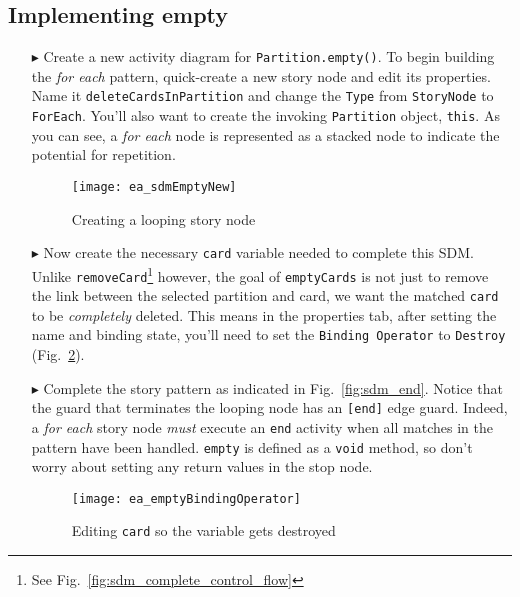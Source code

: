 \newpage
\hypertarget{emptyPartition vis}{}
\subsection{Implementing empty}
\visHeader

\begin{itemize}

\item[$\blacktriangleright$] Create a new activity diagram for \texttt{Partition.empty()}. To begin building the \emph{for each} pattern, quick-create a new
story node and edit its properties. Name it \texttt{deleteCardsInPartition} and change the \texttt{Type} from \texttt{StoryNode} to \texttt{ForEach}. You'll also want
to create the invoking \texttt{Partition} object, \texttt{this}. As you can see, a \emph{for each} node is represented as a stacked node to
indicate the potential for repetition.

\begin{figure}[htbp]
\begin{center}
  \texttt{[image: ea\_sdmEmptyNew]}
  \caption{Creating a looping story node}  
  \label{fig:sdm_foreach}
\end{center}
\end{figure}

\item[$\blacktriangleright$] Now create the necessary \texttt{card} variable needed to complete this SDM. Unlike \texttt{removeCard}\footnote{See
Fig.~\ref{fig:sdm_complete_control_flow}} however, the goal of \texttt{emptyCards} is not just to remove the link between the selected partition and card, we
want the matched \texttt{card} to be \emph{completely} deleted. This means in the properties tab, after setting the name and binding state, you'll need to set
the \texttt{Binding Operator} to \texttt{Destroy} (Fig.~\ref{fig:sdm_bindingOperator}).

\item[$\blacktriangleright$] Complete the story pattern as indicated in Fig.~\ref{fig:sdm_end}. Notice that the guard that terminates the looping node has an
\texttt{[end]} edge guard. Indeed, a \emph{for each} story node \emph{must} execute an \texttt{end} activity when all matches in the pattern have been
handled. \texttt{empty} is defined as a \texttt{void} method, so don't worry about setting any return values in the stop node.

\begin{figure}[htbp]
\begin{center}
  \texttt{[image: ea\_emptyBindingOperator]}
  \caption{Editing \texttt{card} so the variable gets destroyed}  
  \label{fig:sdm_bindingOperator}
\end{center}
\end{figure}


\end{itemize}
